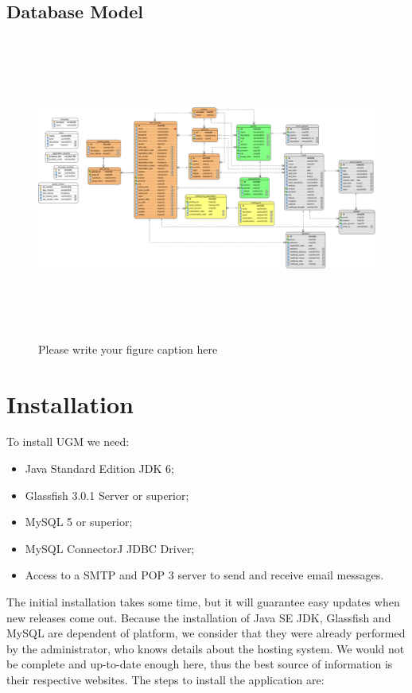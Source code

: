 \documentclass[envcountsame,envcountchap]{svmono}
\begin{document}
\section{Database Model}

\begin{figure}
\centering
\includegraphics[height=10cm, angle=90]{figures/relational-model}
\caption{Please write your figure caption here}
\label{fig:1}
\end{figure}

\chapter{Installation}

To install UGM we need:

\begin{itemize}
\item Java Standard Edition JDK 6;
\item Glassfish 3.0.1 Server or superior;
\item MySQL 5 or superior;
\item MySQL ConnectorJ JDBC Driver;
\item Access to a SMTP and POP 3 server to send and receive email messages.
\end{itemize}

The initial installation takes some time, but it will guarantee easy updates when new releases come out. Because the installation of Java SE JDK, Glassfish and MySQL are dependent of platform, we consider that they were already performed by the administrator, who knows details about the hosting system. We would not be complete and up-to-date enough here, thus the best source of information is their respective websites. The steps to install the application are:
\end{document}
